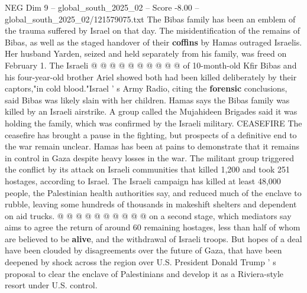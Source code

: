 \begin{textsample}{NEG Dim 9 – global\_south\_2025\_02 – Score -8.00 – global\_south\_2025\_02/121579075.txt}
The Bibas family has been an emblem of the trauma suffered by Israel on that day.
The misidentification of the remains of Bibas, as well as the staged handover of their \textbf{coffins} by Hamas outraged Israelis.
Her husband Yarden, seized and held separately from his family, was freed on February 1.
The Israeli @ @ @ @ @ @ @ @ @ @ of 10-month-old Kfir Bibas and his four-year-old brother Ariel showed both had been killed deliberately by their captors,"in cold blood."Israel ' s Army Radio, citing the \textbf{forensic} conclusions, said Bibas was likely slain with her children.
Hamas says the Bibas family was killed by an Israeli airstrike.
A group called the Mujahideen Brigades said it was holding the family, which was confirmed by the Israeli military.
CEASEFIRE The ceasefire has brought a pause in the fighting, but prospects of a definitive end to the war remain unclear.
Hamas has been at pains to demonstrate that it remains in control in Gaza despite heavy losses in the war.
The militant group triggered the conflict by its attack on Israeli communities that killed 1,200 and took 251 hostages, according to Israel.
The Israeli campaign has killed at least 48,000 people, the Palestinian health authorities say, and reduced much of the enclave to rubble, leaving some hundreds of thousands in makeshift shelters and dependent on aid trucks. @ @ @ @ @ @ @ @ @ @ on a second stage, which mediators say aims to agree the return of around 60 remaining hostages, less than half of whom are believed to be \textbf{alive}, and the withdrawal of Israeli troops.
But hopes of a deal have been clouded by disagreements over the future of Gaza, that have been deepened by shock across the region over U.S.
President Donald Trump ' s proposal to clear the enclave of Palestinians and develop it as a Riviera-style resort under U.S. control.

\end{textsample}
